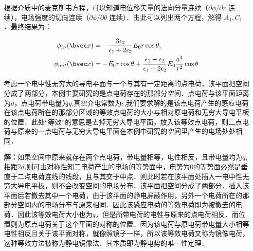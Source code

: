 根据介质中的麦克斯韦方程，可以知道电位移矢量的法向分量连续（$\partial\phi/\partial r$ 连续），电场强度的切向连续（$\partial\phi/\partial \theta$ 连续）．由此可以列出两个方程，解得 $A_1,C_1$．最终结果为：

\begin{align}
\phi_{in}(\bvec x)&=-\frac{3\epsilon_2}{\epsilon_1+2\epsilon_2}E_0r\cos\theta,\\
\phi_{out}(\bvec x)&=-E_0r\cos\theta+\frac{\epsilon_1-\epsilon_2}{\epsilon_1+2\epsilon_2}E_0\frac{a^3}{r^2}\cos\theta
\end{align}
\begin{example}{}\label{empoi_ex1}
考虑一个电中性无穷大的导电平面与一个与其有一定距离的点电荷，该平面把空间分成了两部分，本例主要研究的是点电荷存在的那部分空间．点电荷与该平面距离为$d$，点电荷带电量为$q$,真空介电常数为$\epsilon$,我们要求解的是该点电荷产生的感应电荷在该点电荷所在的那部分区域的等效点电荷的大小与相对原电荷和无穷大导电平板的位置．此处“等效”的意思是去掉无穷大导电平面，放入该等效点电荷，则二点电荷与原来的一点电荷与无穷大导电平面在本例中研究的空间里产生的电场处处相同．
\end{example}
\textbf{解：}如果空间中原来就存在两个点电荷，带电量相等，电性相反，且带电量均为$q$,相距$2d$,则可由对称性知二电荷产生的电场的等势面中，电势为$0$的等势面必然是垂直于二点电荷连线的线段，且与其交于中点．则此时若在该平面处插入一电中性无穷大导电平板，则不会改变空间的电场分布．该平面把空间分成了两部分．插入该平面后若撤去其中一个电荷，由于该平面的静电屏蔽作用，另外一个电荷所在的那部分空间内的电场分布与原来相同．因此该感应电荷的等效电荷即为被撤去的电荷．因此该等效电荷大小也为$q$，但是所带电荷的电性与原来的点电荷相反．而位置则为原点电荷关于这个平面的对称的位置．因为该电荷与原电荷带电量大小相等电性相反且关于该平面对称，就像照镜子一样，所以该等效电荷又称为镜像电荷，这种等效方法被称为静电镜像法．其本质即为静电势的唯一性定理．
